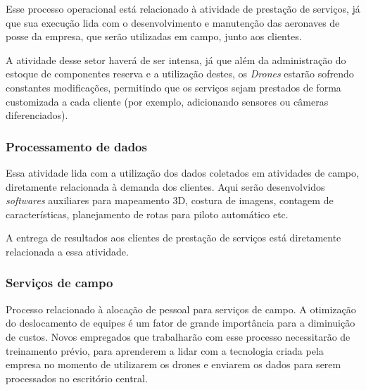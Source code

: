 Esse processo operacional está relacionado à atividade de 
prestação de serviços, já que sua execução lida com o 
desenvolvimento e manutenção das aeronaves de posse da 
empresa, que serão utilizadas em campo, junto aos clientes.

A atividade desse setor haverá de ser intensa, já que além
da administração do estoque de componentes reserva e a 
utilização destes, os \emph{Drones} estarão sofrendo 
constantes modificações, permitindo que os serviços sejam 
prestados de forma customizada a cada cliente (por exemplo,
adicionando sensores ou câmeras diferenciados).

\subsubsection{Processamento de dados}

Essa atividade lida com a utilização dos dados coletados em
atividades de campo, diretamente relacionada à demanda dos 
clientes. Aqui serão desenvolvidos \emph{softwares} auxiliares
para mapeamento 3D, costura de imagens, contagem de 
características, planejamento de rotas para piloto 
automático etc.

A entrega de resultados aos clientes de prestação de serviços
está diretamente relacionada a essa atividade.

\subsubsection{Serviços de campo}

Processo relacionado à alocação de pessoal para serviços de
campo. A otimização do deslocamento de equipes é um fator de
grande importância para a diminuição de custos. Novos 
empregados que trabalharão com esse processo necessitarão de
treinamento prévio, para aprenderem a lidar com a tecnologia
criada pela empresa no momento de utilizarem os drones e 
enviarem os dados para serem processados no escritório 
central.